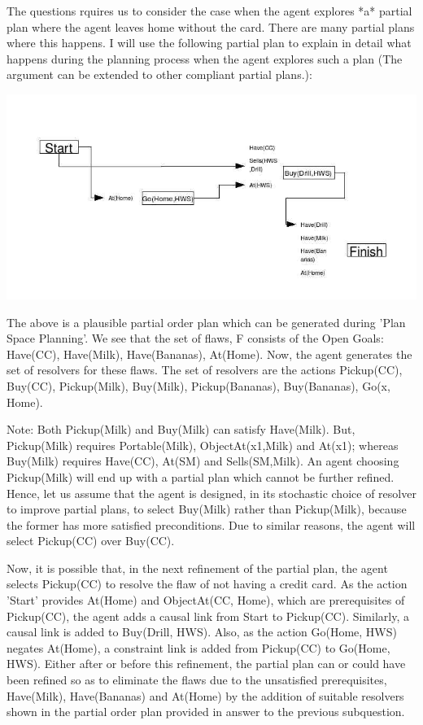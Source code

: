 \documentclass[10pt]{article}
\begin{document}
The questions rquires us to consider the case when the agent explores *a* partial plan where the agent leaves home without the card. There are many partial plans where this happens. I will use the following partial plan to explain in detail what happens during the planning process when the agent explores such a plan (The argument can be extended to other compliant partial plans.): 

\begin{center}
 \includegraphics[scale=0.4]{pp1.jpg}
\end{center}

The above is a plausible partial order plan which can be generated during 'Plan Space Planning'. We see that the set of flaws, F consists of the Open Goals: {Have(CC), Have(Milk), Have(Bananas), At(Home)}. Now, the agent generates the set of resolvers for these flaws. The set of resolvers are the actions {Pickup(CC), Buy(CC), Pickup(Milk), Buy(Milk), Pickup(Bananas), Buy(Bananas), Go(x, Home)}.

Note: Both Pickup(Milk) and Buy(Milk) can satisfy Have(Milk). But, Pickup(Milk) requires Portable(Milk), ObjectAt(x1,Milk) and At(x1); whereas Buy(Milk) requires Have(CC), At(SM) and Sells(SM,Milk). An agent choosing Pickup(Milk) will end up with a partial plan which cannot be further refined. Hence, let us assume that the agent is designed, in its stochastic choice of resolver to improve partial plans, to select Buy(Milk) rather than Pickup(Milk), because the former has more satisfied preconditions. Due to similar reasons, the agent will select Pickup(CC) over Buy(CC).

Now, it is possible that, in the next refinement of the partial plan, the agent selects Pickup(CC) to resolve the flaw of not having a credit card. As the action 'Start' provides At(Home) and ObjectAt(CC, Home), which are prerequisites of Pickup(CC), the agent adds a causal link from Start to Pickup(CC). Similarly, a causal link is added to Buy(Drill, HWS). Also, as the action Go(Home, HWS) negates At(Home), a constraint link is added from Pickup(CC) to Go(Home, HWS). Either after or before this refinement, the partial plan can or could have been refined so as to eliminate the flaws due to the unsatisfied prerequisites, Have(Milk), Have(Bananas) and At(Home) by the addition of suitable resolvers shown in the partial order plan provided in answer to the previous subquestion.
\end{document}
